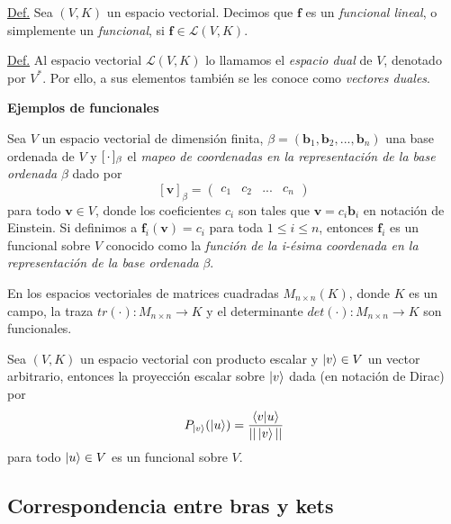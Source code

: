 \documentclass[12pt,dvipsnames]{article}
\begin{document}
\vspace{3mm}
\begin{tcolorbox}
    \underline{Def.} Sea $(V,K)$ un espacio vectorial. Decimos que $\textbf{f}$ es un \emph{funcional lineal}, o simplemente un \emph{funcional}, si $\textbf{f}\in\mathcal{L}(V,K)$.

\vspace{3mm}
    \underline{Def.} Al espacio vectorial $\mathcal{L}(V,K)$ lo llamamos el \emph{espacio dual} de $V$, denotado por $V^*$. Por ello, a sus elementos también se les conoce como \emph{vectores duales}. 
\end{tcolorbox}

\vspace{3mm}
\textbf{Ejemplos de funcionales} \label{Ejem:Funcionales}

\vspace{3mm}
Sea $V$ un espacio vectorial de dimensión finita, $\beta=(\mathbf{b}_1,\mathbf{b}_2,...,\mathbf{b}_n)$ una base ordenada de $V$ y $[\hspace{0.5mm} \cdot\hspace{0.5mm}]_\beta$ el \emph{mapeo de coordenadas en la representación de la base ordenada} $\beta$ dado por $$[\mathbf{v}]_\beta=\begin{pmatrix} c_1&c_2&...&c_n \end{pmatrix}$$ para todo $\mathbf{v}\in V$, donde los coeficientes $c_i$ son tales que $\mathbf{v}=c_i \mathbf{b}_i$ en notación de Einstein. Si definimos a $\textbf{f}_i(\mathbf{v})=c_i$ para toda $1\le i\le n$, entonces $\textbf{f}_i$ es un funcional sobre $V$ conocido como la \emph{función de la i-ésima coordenada en la representación de la base ordenada} $\beta$. 

\vspace{3mm}
En los espacios vectoriales de matrices cuadradas $M_{n\times n}(K)$, donde $K$ es un campo, la traza $tr(\cdot):M_{n\times n}\to K$ y el determinante $det(\cdot):M_{n\times n}\to K$ son funcionales.

\vspace{3mm}
Sea $(V,K)$ un espacio vectorial con producto escalar y $\ket{v}\in V$ un vector arbitrario, entonces la proyección escalar sobre $\ket{v}$ dada (en notación de Dirac) por $$P_{\ket{{v}}}(\ket{u}) = \frac{\braket{v|u}}{||\ket{v}||}$$ para todo $\ket{u}\in V$ es un funcional sobre $V$. 

\newpage
\subsection{Correspondencia entre bras y kets} \label{Subsec:Correspondencia entre bras y kets} 
\end{document}
